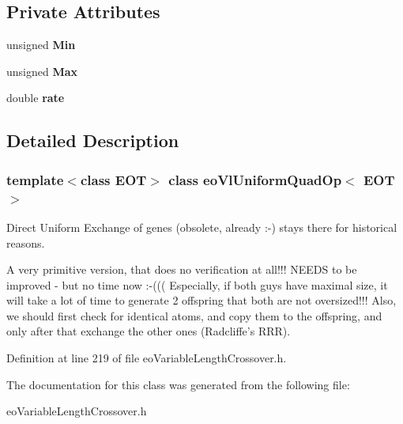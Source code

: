 \subsection*{Private Attributes}
\begin{CompactItemize}
\item 
unsigned {\bf Min}\label{classeo_vl_uniform_quad_op_r0}

\item 
unsigned {\bf Max}\label{classeo_vl_uniform_quad_op_r1}

\item 
double {\bf rate}\label{classeo_vl_uniform_quad_op_r2}

\end{CompactItemize}


\subsection{Detailed Description}
\subsubsection*{template$<$class EOT$>$ class eo\-Vl\-Uniform\-Quad\-Op$<$ EOT $>$}

Direct Uniform Exchange of genes (obsolete, already :-) stays there for historical reasons. 

A very primitive version, that does no verification at all!!! NEEDS to be improved - but no time now :-((( Especially, if both guys have maximal size, it will take a lot of time to generate 2 offspring that both are not oversized!!! Also, we should first check for identical atoms, and copy them to the offspring, and only after that exchange the other ones (Radcliffe's RRR). 



Definition at line 219 of file eo\-Variable\-Length\-Crossover.h.

The documentation for this class was generated from the following file:\begin{CompactItemize}
\item 
eo\-Variable\-Length\-Crossover.h\end{CompactItemize}
